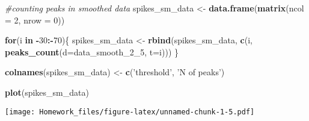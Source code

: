 \documentclass[]{article}
\newenvironment{Shaded}{\begin{snugshade}}{\end{snugshade}}
\newcommand{\KeywordTok}[1]{\textcolor[rgb]{0.13,0.29,0.53}{\textbf{#1}}}
\newcommand{\DataTypeTok}[1]{\textcolor[rgb]{0.13,0.29,0.53}{#1}}
\newcommand{\DecValTok}[1]{\textcolor[rgb]{0.00,0.00,0.81}{#1}}
\newcommand{\StringTok}[1]{\textcolor[rgb]{0.31,0.60,0.02}{#1}}
\newcommand{\CommentTok}[1]{\textcolor[rgb]{0.56,0.35,0.01}{\textit{#1}}}
\newcommand{\ControlFlowTok}[1]{\textcolor[rgb]{0.13,0.29,0.53}{\textbf{#1}}}
\newcommand{\OperatorTok}[1]{\textcolor[rgb]{0.81,0.36,0.00}{\textbf{#1}}}
\newcommand{\NormalTok}[1]{#1}
\begin{document}
\begin{Shaded}
\begin{Highlighting}[]
\CommentTok{#counting peaks in smoothed data}
\NormalTok{spikes_sm_data <-}\StringTok{ }\KeywordTok{data.frame}\NormalTok{(}\KeywordTok{matrix}\NormalTok{(}\DataTypeTok{ncol =} \DecValTok{2}\NormalTok{, }\DataTypeTok{nrow =} \DecValTok{0}\NormalTok{))}

\ControlFlowTok{for}\NormalTok{(i }\ControlFlowTok{in} \OperatorTok{-}\DecValTok{30}\OperatorTok{:-}\DecValTok{70}\NormalTok{)\{}
\NormalTok{  spikes_sm_data <-}\StringTok{ }\KeywordTok{rbind}\NormalTok{(spikes_sm_data, }\KeywordTok{c}\NormalTok{(i, }\KeywordTok{peaks_count}\NormalTok{(}\DataTypeTok{d=}\NormalTok{data_smooth_2_}\DecValTok{5}\NormalTok{, }\DataTypeTok{t=}\NormalTok{i)))}
\NormalTok{\}}

\KeywordTok{colnames}\NormalTok{(spikes_sm_data) <-}\StringTok{ }\KeywordTok{c}\NormalTok{(}\StringTok{'threshold'}\NormalTok{, }\StringTok{'N of peaks'}\NormalTok{)}

\KeywordTok{plot}\NormalTok{(spikes_sm_data)}
\end{Highlighting}
\end{Shaded}

\texttt{[image: Homework\_files/figure-latex/unnamed-chunk-1-5.pdf]}
\end{document}
